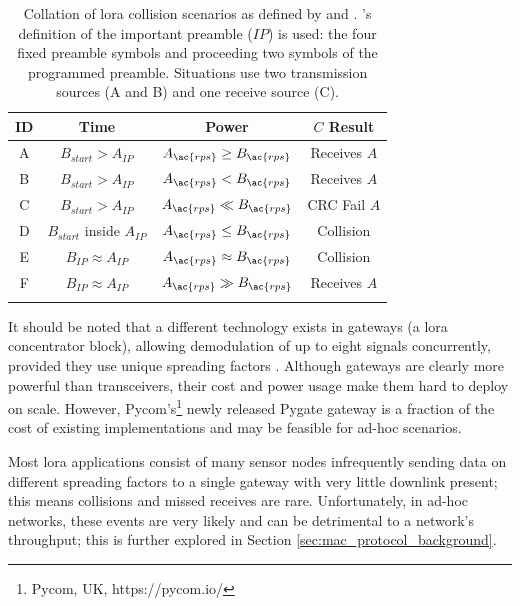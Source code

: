 \begin{table}[H]
\centering\small
\caption[\ac{lora} collision scenarios]{Collation of \ac{lora} collision scenarios as defined by \cite{3YP:LORA_FOR_IOT} and \cite{3YP:LORA_COLLISIONS}. \cite{3YP:LORA_COLLISIONS}'s definition of the important preamble ($IP$) is used: the four fixed preamble symbols and proceeding two symbols of the programmed preamble. Situations use two transmission sources (A and B) and one receive source (C).}
\begin{tabular}{c|cc|c}
    \toprule
    \textbf{ID} & \textbf{Time} & \textbf{Power} & \textbf{$C$ Result}\\
    \midrule\addlinespace
    A & $B_{start} > A_{IP}$ & $A_{\ac{rps}} \geq B_{\ac{rps}}$ & Receives $A$ \\
    B & $B_{start} > A_{IP}$ & $A_{\ac{rps}} < B_{\ac{rps}}$ &  Receives $A$ \\
    C & $B_{start} > A_{IP}$ & $A_{\ac{rps}} \ll B_{\ac{rps}}$ & CRC Fail $A$ \\
    D & $B_{start}$ inside $A_{IP}$ & $A_{\ac{rps}} \leq B_{\ac{rps}}$ & Collision \\
    E & $B_{IP} \approx A_{IP}$ & $A_{\ac{rps}} \approx B_{\ac{rps}}$ & Collision \\
    F & $B_{IP} \approx A_{IP}$ & $A_{\ac{rps}} \gg B_{\ac{rps}}$ & Receives $A$ \\
    \addlinespace\bottomrule
\end{tabular}
\label{tab:collisions}
\end{table}

 It should be noted that a different technology exists in gateways (a \ac{lora} concentrator block), allowing demodulation of up to eight signals concurrently, provided they use unique spreading factors \cite{3YP:LORA_SX1301}. Although gateways are clearly more powerful than transceivers, their cost and power usage make them hard to deploy on scale. However, Pycom's\footnote{Pycom, UK,  https://pycom.io/} newly released Pygate gateway is a fraction of the cost of existing implementations and may be feasible for ad-hoc scenarios.

 Most \ac{lora} applications consist of many sensor nodes infrequently sending data on different spreading factors to a single gateway with very little downlink present; this means collisions and missed receives are rare. Unfortunately, in ad-hoc networks, these events are very likely and can be detrimental to a network's throughput; this is further explored in Section \ref{sec:mac_protocol_background}.
\newpage
